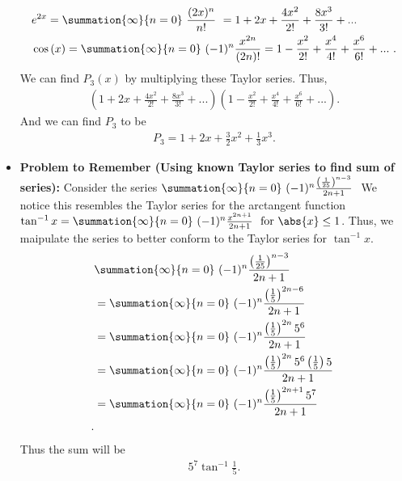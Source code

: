 \documentclass{report}
\begin{document}
\begin{itemize}
\begin{align*}
                    &e^{2x} = \summation{\infty}{n=0}\ \frac{(2x)^{n}}{n!}\  = 1+2x + \frac{4x^{2}}{2!} + \frac{8x^{3}}{3!} + ...\\
                    &\cos{(x)} = \summation{\infty}{n=0}\ (-1)^{n}\frac{x^{2n}}{(2n)!} = 1-\frac{x^{2}}{2!} + \frac{x^{4}}{4!} + \frac{x^{6}}{6!} + ...\ 
                .\end{align*}
                We can find $P_{3}(x)$ by multiplying  these Taylor series. Thus,
                \begin{align*}
                    (1+2x + \frac{4x^{2}}{2!} + \frac{8x^{3}}{3!} + ...)(1-\frac{x^{2}}{2!} + \frac{x^{4}}{4!} + \frac{x^{6}}{6!}+...)
                .\end{align*}
                And we can find $P_{3}$ to be 
                \begin{align*}
                    P_{3} = 1 +2x + \frac{3}{2}x^{2} +\frac{1}{3}x^{3}
                .\end{align*}
            \item \textbf{Problem to Remember (Using known Taylor series to find sum of series):} Consider the series $\summation{\infty}{n=0}\ (-1)^{n}\frac{\left(\frac{1}{25}\right)^{n-3}}{2n+1}\ $
                \bigbreak \noindent 
                We notice this resembles the Taylor series for the arctangent function $\tan^{-1}{x} = \summation{\infty}{n=0}\ (-1)^{n}\frac{x^{2n+1}}{2n+1}\ \text{ for } \abs{x} \leq 1$. Thus, we maipulate the series to better conform to the Taylor series for $\tan^{-1}{x}$.
                \begin{align*}
                   &\summation{\infty}{n=0}\ (-1)^{n}\frac{\left(\frac{1}{25}\right)^{n-3}}{2n+1}\  \\
                   &=\summation{\infty}{n=0}\ (-1)^{n}\frac{\left(\frac{1}{5}\right)^{2n-6}}{2n+1}\ \\
                   &=\summation{\infty}{n=0}\ (-1)^{n}\frac{\left(\frac{1}{5}\right)^{2n}5^{6}}{2n+1}\ \\
                   &=\summation{\infty}{n=0}\ (-1)^{n}\frac{\left(\frac{1}{5}\right)^{2n}5^{6}\left(\frac{1}{5}\right)5}{2n+1}\ \\
                   &=\summation{\infty}{n=0}\ (-1)^{n}\frac{\left(\frac{1}{5}\right)^{2n+1}5^{7}}{2n+1}\ \\
               .\end{align*}
               Thus the sum will be 
               \begin{align*}
                   5^{7}\tan^{-1}{\frac{1}{5}}
               .\end{align*}

       \end{itemize}
\end{document}

